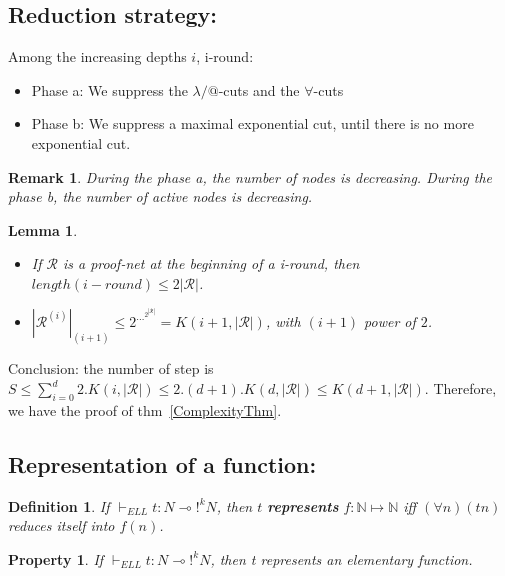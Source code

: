 \documentclass[a4paper,10pt]{article}
\newcommand{\limpl}{\multimap}  %
\newcommand{\pnet}{\mathcal{R}} %
\newcommand{\Nset}{\mathbb{N}} %
\newtheorem{definition}{Definition}
\newtheorem{prop}{Property}
\newtheorem{lem}{Lemma}
\newtheorem{rmk}{Remark}
\begin{document}
\subsection{Reduction strategy:}
 Among the increasing depths $i$, i-round:
\begin{itemize}
	\item Phase a: We suppress the $\lambda/@$-cuts and the $\forall$-cuts
	\item Phase b: We suppress a maximal exponential cut, until there is no more exponential cut.
\end{itemize}

\begin{rmk}
	During the phase a, the number of nodes is decreasing. During the phase b, the number of active nodes is decreasing.
\end{rmk}

\begin{lem}
	\begin{itemize}
		\item If $\pnet$ is a proof-net at the beginning of a i-round, then $length(i-round) \leq 2 |\pnet|$.
		\item $|\pnet^{(i)}|_{(i+1)} \leq 2^{\dots^{2^{|\pnet|}}} = K(i+1, |\pnet|)$, with $(i+1)$ power of $2$.
	\end{itemize}
\end{lem}

 Conclusion: the number of step is $S \leq \sum_{i=0}^{d} 2.K(i,|\pnet|) \leq 2.(d+1).K(d,|\pnet|) \leq K(d+1,|\pnet|)$. Therefore, we have the proof of thm~\ref{ComplexityThm}.

\subsection{Representation of a function:}

\begin{definition}
If $\vdash_{ELL} t: N \limpl !^{k} N$, then $t$ \textbf{represents} $f:\Nset \mapsto \Nset$ iff $(\forall n) (t n)$ reduces itself into $f(n)$.
\end{definition}

\begin{prop}
If $\vdash_{ELL} t:N \limpl !^{k} N$, then t represents an elementary function.
\end{prop}
\end{document}
